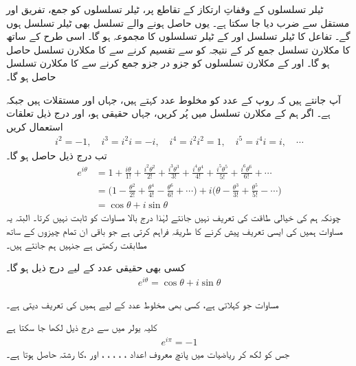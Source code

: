 ٹیلر تسلسلوں کے وقفاتِ ارتکاز کے تقاطع پر، ٹیلر تسلسلوں کو  جمع، تفریق  اور مستقل سے ضرب دیا جا سکتا ہے۔ یوں حاصل ہونے والے  تسلسل بھی ٹیلر تسلسل ہوں گے۔ تفاعل  کا ٹیلر تسلسل  اور  کے ٹیلر تسلسلوں کا مجموعہ ہو گا۔ اسی طرح  کے ساتھ  کا مکلارن تسلسل جمع کر کے نتیجہ کو  سے تقسیم کرنے سے   کا مکلارن تسلسل حاصل ہو گا۔   اور  کے مکلارن تسلسلوں کو جزو در جزو جمع کرنے سے  کا مکلارن تسلسل حاصل ہو گا۔  

آپ جانتے ہیں کہ  روپ کے عدد کو مخلوط عدد کہتے ہیں، جہاں  اور  مستقلات ہیں جبکہ  ہے۔ اگر ہم  کے مکلارن تسلسل میں   پُر کریں، جہاں  حقیقی ہو، اور درج ذیل تعلقات استعمال کریں
\begin{align*}
i^2=-1,\quad i^3=i^2i=-i,\quad i^4=i^2i^2=1,\quad i^5=i^4i=i,\quad \cdots
\end{align*}
تب درج ذیل حاصل ہو گا۔
\begin{align*}
e^{i\theta}&=1+\frac{i\theta}{1!}+\frac{i^2\theta^2}{2!}+\frac{i^3\theta^3}{3!}+\frac{i^4\theta^4}{4!}+\frac{i^5\theta^5}{5!}+\frac{i^6\theta^6}{6!}+\cdots\\
&=\big(1-\frac{\theta^2}{2!}+\frac{\theta^4}{4!}-\frac{\theta^6}{6!}+\cdots\big)+i\big(\theta-\frac{\theta^3}{3!}+\frac{\theta^5}{5!}-\cdots\big)\\
&=\cos \theta+i\sin \theta
\end{align*}
چونکہ ہم  کی  خیالی طاقت کی تعریف نہیں جانتے  لہٰذا درج بالا مساوات  کو ثابت نہیں کرتا۔ البتہ یہ مساوات ہمیں  کی ایسی تعریف پیش کرنے کا طریقہ فراہم کرتی ہے جو باقی ان تمام چیزوں کے ساتھ مطابقت رکھتی  ہے جنہیں ہم جانتے ہیں۔

کسی بھی حقیقی عدد  کے لیے درج ذیل ہو گا۔
\begin{align}\label{مساوات_تسلسل_کلیہ_یولر_الف}
e^{i\theta}=\cos \theta+i\sin\theta
\end{align}

مساوات  جو  کہلاتی ہے، کسی بھی مخلوط عدد  کے لیے  ہمیں  کی تعریف  دیتی ہے۔ 

کلیہ یولر میں  سے  درج ذیل لکھا جا سکتا ہے 
\begin{align*}
e^{i\pi}=-1
\end{align*}
جس کو   لکھ کر ریاضیات میں پانچ  معروف اعداد ، ، ، ، ، اور ،کا رشتہ حاصل ہوتا ہے۔

